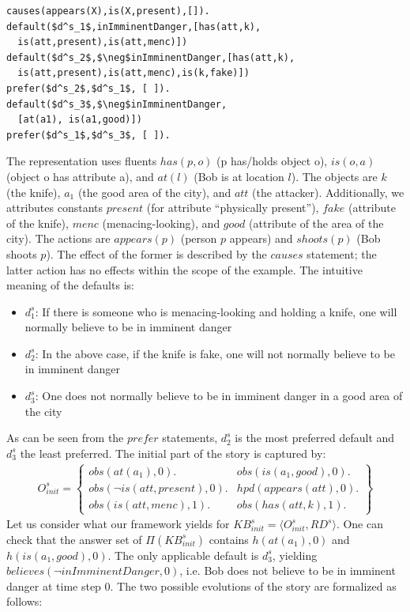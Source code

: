 \documentclass{article}
\begin{document}
\begin{lstlisting}[language=clingo,caption=Set $RD^s$ of statements for the self-defense example, label=lst:pi_S, mathescape=true,xleftmargin=.01\textwidth, breaklines=true]
causes(appears(X),is(X,present),[]).
default($d^s_1$,inImminentDanger,[has(att,k),
  is(att,present),is(att,menc)])
default($d^s_2$,$\neg$inImminentDanger,[has(att,k),
  is(att,present),is(att,menc),is(k,fake)])
prefer($d^s_2$,$d^s_1$, [ ]).
default($d^s_3$,$\neg$inImminentDanger,
  [at(a1), is(a1,good)])
prefer($d^s_1$,$d^s_3$, [ ]).
\end{lstlisting}
The representation uses fluents $has(p,o)$ (p has/holds object o), $is(o,a)$ (object o has attribute a), and $at(l)$ (Bob is at location $l$). The objects are $k$ (the knife), $a_1$ (the good area of the city), and $att$ (the attacker). Additionally, we attributes constants $present$ (for attribute ``physically present''), $fake$ (attribute of the knife), $menc$ (menacing-looking), and $good$ (attribute of the area of the city). The actions are $appears(p)$ (person $p$ appears) and $shoots(p)$ (Bob shoots $p$). The effect of the former is described by the $causes$ statement; the latter action has no effects within the scope of the example. The intuitive meaning of the defaults is:
\begin{itemize}
\item $d^s_1$: If there is someone who is menacing-looking and holding a knife, one will normally believe to be in imminent danger
\item $d^s_2$: In the above case, if the knife is fake, one will not normally believe to be in imminent danger
\item $d^s_3$: One does not normally believe to be in imminent danger in a good area of the city
\end{itemize} 
As can be seen from the $prefer$ statements, $d^s_2$ is the most preferred default and $d^s_3$ the least preferred.
The initial part of the story is captured by:
\[
\begin{array}{lll}
O^s_{init}  =  \left\{
\begin{array}{ll} 
obs(at(a_1),0).   %
& obs(is(a_1,good),0). \\
obs(\neg is(att,present),0). & 
hpd(appears(att),0). \\    %
obs(is(att,menc),1). &  %
obs(has(att,k),1).
\end{array}
\right\}
\end{array}
\]
Let us consider what our framework yields for $KB^s_{init}=\langle O^s_{init},RD^s \rangle$. One can check that the answer set of $\Pi(KB^s_{init})$ contains $h(at(a_1),0)$ and $h(is(a_1,good),0)$. The only applicable default is $d^s_3$, yielding $believes(\neg inImminentDanger,0)$, i.e. Bob does not believe to be in imminent danger at time step $0$. The two possible evolutions of the story are formalized as follows:
\end{document}
